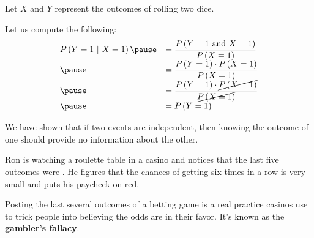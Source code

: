 \documentclass{beamer}
\newcommand{\prob}[1]{P\left({#1}\right)}
\newcommand{\jointprob}[3]{\prob{{#1}~\text{#2}~{#3}}}
\newcommand{\condprob}[2]{\prob{{#1}~|~{#2}}}
\begin{document}
\begin{frame}
\begin{example}
Let $X$ and $Y$ represent the outcomes of rolling two dice.

\vspace{2mm}
Let us compute the following:
\begin{equation*}
\begin{array}{ll}
\condprob{Y=1}{X=1} \pause
&= \dfrac{\jointprob{Y=1}{and}{X=1}}{\prob{X=1}} \\\pause
&= \dfrac{\prob{Y=1}\cdot\prob{X=1}}{\prob{X=1}} \\\pause
&= \dfrac{\prob{Y=1}\cdot\cancel{\prob{X=1}}}{\cancel{\prob{X=1}}} \\\pause
&= \prob{Y=1}
\end{array}
\end{equation*}
\end{example}\pause

\begin{note}
We have shown that if two events are independent, then knowing the outcome of one should provide no information about the other.
\end{note}
\end{frame}

\begin{frame}
\begin{example}
Ron is watching a roulette table in a casino and notices that the last five outcomes were . He figures that the chances of getting  six times in  a row is very small and puts his paycheck on red.

\vspace{2mm}
\pause

\end{example}\pause

\begin{note}
Posting the last several outcomes of a betting game is a real practice casinos use to trick people into believing the odds are in their favor. It's known as the \textbf{gambler's fallacy}.
\end{note}
\end{frame}
\end{document}
